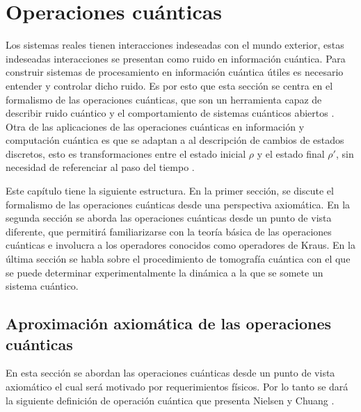 \chapter{Operaciones cuánticas}\label{OpCuanticas}

Los sistemas reales tienen interacciones indeseadas con el mundo exterior,
estas indeseadas interacciones se presentan como ruido en información cuántica.
Para construir sistemas de procesamiento en información cuántica útiles es
necesario entender y controlar dicho ruido. Es por esto que esta sección se
centra en el formalismo de las operaciones cuánticas, que son un herramienta
capaz de describir ruido cuántico y el comportamiento de sistemas cuánticos
abiertos . Otra de las aplicaciones de las operaciones cuánticas en información
y computación cuántica  es que se adaptan a al descripción de cambios de
estados discretos, esto es transformaciones entre el estado inicial $\rho$ y el
estado final $\rho'$, sin necesidad de referenciar al paso del tiempo
\cite{nielsen_chuang_2010}. 


Este capítulo tiene la siguiente estructura. En la primer sección, se discute
el formalismo de las operaciones cuánticas desde una perspectiva axiomática. En
la segunda sección se aborda las operaciones cuánticas desde un punto de vista
diferente, que permitirá familiarizarse con la teoría básica de las operaciones
cuánticas e involucra a los operadores conocidos como operadores de Kraus. En
la última sección se habla sobre el procedimiento de tomografía cuántica con el
que se puede determinar experimentalmente la dinámica a la que se somete un
sistema cuántico. 
\section{Aproximación axiomática de las operaciones cuánticas} %
En esta sección se abordan las operaciones cuánticas desde un punto de vista
axiomático el cual será motivado por requerimientos físicos. Por lo tanto
 se
dará la siguiente definición de operación cuántica que presenta Nielsen y
Chuang {\cite{nielsen_chuang_2010}}.



